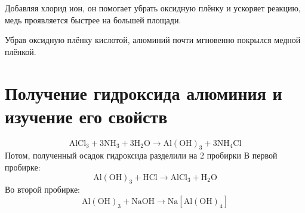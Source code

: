 \documentclass[a4paper,12pt]{article}
\begin{document}
Добавляя хлорид ион, он помогает убрать оксидную плёнку и ускоряет реакцию, медь проявляется быстрее на большей площади.

Убрав оксидную плёнку кислотой, алюминий почти мгновенно покрылся медной плёнкой.
\section{Получение гидроксида алюминия и изучение его свойств}
\begin{equation} 
\mathrm{AlCl_3 + 3NH_3 + 3H_2O \longrightarrow Al(OH)_3 + 3NH_4Cl} 
\end{equation}
Потом, полученный осадок гидроксида разделили на 2 пробирки
В первой пробирке:
\begin{equation} 
\mathrm{Al(OH)_3 + HCl \longrightarrow AlCl_3 + H_2O} 
\end{equation}
Во второй пробирке:
\begin{equation} 
\mathrm{Al(OH)_3 + NaOH \longrightarrow Na[Al(OH)_4]} 
\end{equation}
\end{document}
